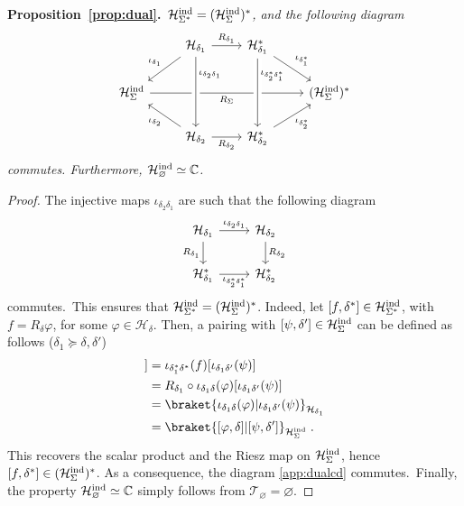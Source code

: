 \documentclass[11pt]{article}
\newcommand{\C}{\mathbb{C}}
\newcommand{\Hind}{\mathcal{H}_{\Sigma}^{\rm ind}}
\newcommand{\h}{\mathcal{H}}
\theoremstyle{definition}
\numberwithin{equation}{section}
\begin{document}
\noindent\textbf{Proposition~\ref{prop:dual}.}~\emph{$\h_{\Sigma^*}^{\rm ind}= (\h_{\Sigma}^{\rm ind})^*$, and the following diagram}
 \begin{equation}
    \label{app:dualcd}
    \begin{tikzcd} 
      & \h_{\delta_1} \arrow{ld}[swap]{\iota_{\delta_1}} \arrow[r, "R_{\delta_1}"] &  \h_{\delta_1}^* \arrow[rd, "\iota_{\delta_1^*}"] & \\ 
      \h_{\Sigma}^{\rm ind} \arrow{rrr}[swap]{R_{\Sigma}}& & & (\h_{\Sigma}^{\rm ind})^*\\
       & \h_{\delta_2} \arrow[from=uu, crossing over, "\iota_{\delta_2\delta_1}" near start]\arrow[lu, "\iota_{\delta_2}"]\arrow{r}[swap]{R_{\delta_2}} &  \h_{\delta_2}^* \arrow{ru}[swap]{\iota_{\delta_2^*}} \arrow[from=uu, crossing over, "\iota_{\delta_2^*\delta_1^*}" near start]& 
    \end{tikzcd}
\end{equation}    
    \emph{commutes. Furthermore, $\h_{\varnothing}^{\rm ind}\simeq \C$.}
\begin{proof}
    The injective maps $\iota_{\delta_2\delta_1}$ are such that the following diagram
\[\begin{tikzcd} 
     \h_{\delta_1} \arrow[r, "\iota_{\delta_2\delta_1}"] \arrow{d}[swap]{R_{\delta_1}} & \h_{\delta_2} \arrow[d, "R_{\delta_2}"]\\ 
      \h_{\delta_1}^* \arrow{r}[swap]{\iota_{\delta_2^*\delta_1^*}} &  \h_{\delta_2}^*
    \end{tikzcd}\]
commutes.~This ensures that $\h_{\Sigma^*}^{\rm ind}= (\h_{\Sigma}^{\rm ind})^*$. Indeed, let $[f,\delta^*]\in\h_{\Sigma^*}^{\rm ind}$, with $f=R_\delta\varphi$, for some $\varphi\in\h_\delta$. Then, a pairing with $[\psi,\delta']\in \h_{\Sigma}^{\rm ind}$ can be defined as follows ($\delta_1\succeq\delta,\delta'$)
\begin{align*}
    [f,\delta^*][[\psi,\delta']]&=\iota_{\delta_1^*\delta^*}(f)[\iota_{\delta_1\delta'}(\psi)]\\
    &=R_{\delta_1}\circ\iota_{\delta_1\delta}(\varphi)[\iota_{\delta_1\delta'}(\psi)]\\
    &=\braket{\iota_{\delta_1\delta}(\varphi)|\iota_{\delta_1\delta'}(\psi)}_{\h_{\delta_1}}\\
    &=\braket{[\varphi,\delta]|[\psi,\delta']}_{\h_{\Sigma}^{\rm ind}}\;.
\end{align*}
This recovers the scalar product and the Riesz map on $\h_{\Sigma}^{\rm ind}$, hence $[f,\delta^*]\in(\Hind)^*$. As a consequence, the diagram \ref{app:dualcd} commutes.~Finally, the property $\h_{\varnothing}^{\rm ind}\simeq \C$ simply follows from $\mathcal{T}_{\varnothing}=\varnothing$.
\end{proof}
\end{document}
